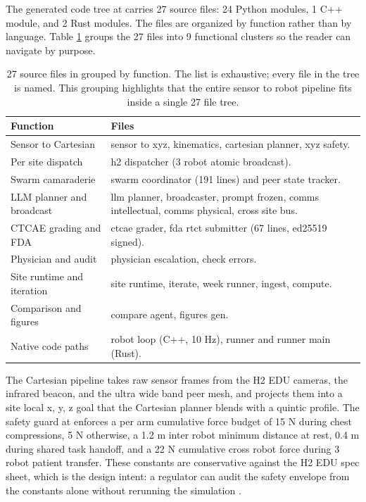 \begin{sectionaccent}
The generated code tree at  carries 27 source
files: 24 Python modules, 1 C++ module, and 2 Rust modules. The files
are organized by function rather than by language. Table
\ref{tbl:src-by-function} groups the 27 files into 9 functional
clusters so the reader can navigate by purpose.

\begin{table}[H]
\captionsetup{type=table}
\caption{27 source files in  grouped by
function. The list is exhaustive; every file in the tree is named.
This grouping highlights that the entire sensor to robot pipeline
fits inside a single 27 file tree.}
\label{tbl:src-by-function}
\small
\begin{tabular}{>{\raggedright\arraybackslash}p{4.6cm}
                >{\raggedright\arraybackslash}p{10.4cm}}
\toprule
\textbf{Function} & \textbf{Files} \\
\midrule
Sensor to Cartesian & sensor to xyz, kinematics, cartesian planner, xyz safety. \\
Per site dispatch & h2 dispatcher (3 robot atomic broadcast). \\
Swarm camaraderie & swarm coordinator (191 lines) and peer state tracker. \\
LLM planner and broadcast & llm planner, broadcaster, prompt frozen, comms intellectual, comms physical, cross site bus. \\
CTCAE grading and FDA & ctcae grader, fda rtct submitter (67 lines, ed25519 signed). \\
Physician and audit & physician escalation, check errors. \\
Site runtime and iteration & site runtime, iterate, week runner, ingest, compute. \\
Comparison and figures & compare agent, figures gen. \\
Native code paths & robot loop (C++, 10 Hz), runner and runner main (Rust). \\
\bottomrule
\end{tabular}
\end{table}

The Cartesian pipeline takes raw sensor frames from the H2 EDU
cameras, the infrared beacon, and the ultra wide band peer mesh, and
projects them into a site local x, y, z goal that the Cartesian
planner blends with a quintic profile. The safety guard at
 enforces a per arm cumulative force budget of 15
N during chest compressions, 5 N otherwise, a 1.2 m inter robot
minimum distance at rest, 0.4 m during shared task handoff, and a
22 N cumulative cross robot force during 3 robot patient transfer.
These constants are conservative against the H2 EDU spec sheet, which
is the design intent: a regulator can audit the safety envelope from
the constants alone without rerunning the simulation
\cite{unitree_h2_2026, iec_80601_2_77}.


\end{sectionaccent}
